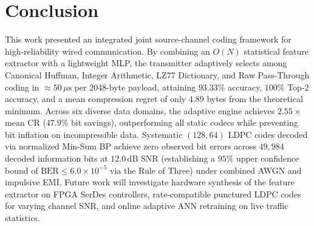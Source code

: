 \documentclass[conference]{IEEEtran}
\begin{document}
\section{Conclusion}
\label{sec:conclusion}
This work presented an integrated joint source-channel coding framework for high-reliability wired communication. By combining an $O(N)$ statistical feature extractor with a lightweight MLP, the transmitter adaptively selects among Canonical Huffman, Integer Arithmetic, LZ77 Dictionary, and Raw Pass-Through coding in $\approx\!50\,\mu\text{s}$ per 2048-byte payload, attaining $93.33\%$ accuracy, $100\%$ Top-2 accuracy, and a mean compression regret of only $4.89$ bytes from the theoretical minimum. Across six diverse data domains, the adaptive engine achieves $2.55\times$ mean CR ($47.9\%$ bit savings), outperforming all static codecs while preventing bit inflation on incompressible data. Systematic $(128, 64)$ LDPC codes decoded via normalized Min-Sum BP achieve zero observed bit errors across $49{,}984$ decoded information bits at $12.0\,\text{dB}$ SNR (establishing a $95\%$ upper confidence bound of $\text{BER} \le 6.0 \times 10^{-5}$ via the Rule of Three) under combined AWGN and impulsive EMI. Future work will investigate hardware synthesis of the feature extractor on FPGA SerDes controllers, rate-compatible punctured LDPC codes for varying channel SNR, and online adaptive ANN retraining on live traffic statistics.
\end{document}
